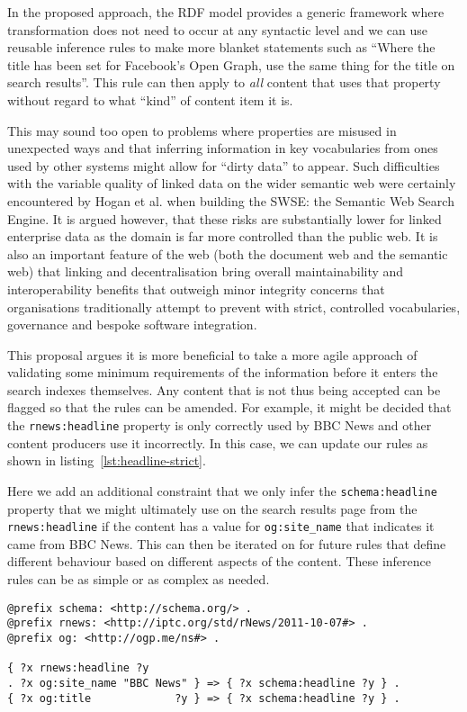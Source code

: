 In the proposed approach, the RDF model provides a generic framework where
transformation does not need to occur at any syntactic level and we
can use reusable inference rules to make more blanket statements such as
``Where the title has been set for Facebook's Open Graph, use the same
thing for the title on search results''. This rule can then apply to \emph{all}
content that uses that property without regard to what ``kind'' of content item
it is.

This may sound too open to problems where properties are misused in
unexpected ways and that inferring information in key vocabularies from
ones used by other systems might allow for ``dirty data'' to appear. Such
difficulties with the variable quality of linked data on the wider semantic
web were certainly encountered by Hogan et al.\cite{hogan2011searching} when
building the SWSE: the Semantic Web Search Engine. It is argued however,
that these risks are substantially lower for linked enterprise data as
the domain is far more controlled than the public web. It is also an important
feature of the web (both the document web and the semantic web) that linking and
decentralisation bring overall maintainability and interoperability benefits
that outweigh minor integrity concerns that organisations traditionally attempt
to prevent with strict, controlled vocabularies, governance and bespoke
software integration.

This proposal argues it is more beneficial to take a more agile approach
of validating some minimum requirements of the information before it
enters the search indexes themselves. Any content that is not thus
being accepted can be flagged so that the rules can be amended. For example,
it might be decided that the \texttt{rnews:headline} property is only
correctly used by BBC News and other content producers use it incorrectly. In
this case, we can update our rules as shown in listing~\ref{lst:headline-strict}.

Here we add an additional constraint
that we only infer the \texttt{schema:headline} property that we might
ultimately use on the search results page from the \texttt{rnews:headline} if
the content has a value for \texttt{og:site\_name} that indicates it came
from BBC News. This can then be iterated on for future rules that define
different behaviour based on different aspects of the content. These inference
rules can be as simple or as complex as needed.

\begin{centering}
\begin{lstlisting}[language=ttl,label=lst:headline-strict,caption=Inference rules where \texttt{rnews:headline} is only used for the headline for content from BBC News.]
@prefix schema: <http://schema.org/> .
@prefix rnews: <http://iptc.org/std/rNews/2011-10-07#> .
@prefix og: <http://ogp.me/ns#> .

{ ?x rnews:headline ?y
. ?x og:site_name "BBC News" } => { ?x schema:headline ?y } .
{ ?x og:title             ?y } => { ?x schema:headline ?y } .
\end{lstlisting}
\end{centering}

